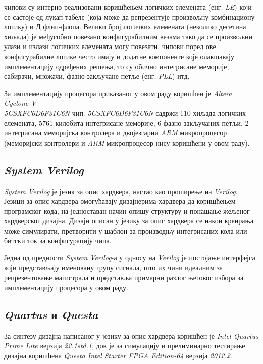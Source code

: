  чипови су интерно реализовани коришћењем логичких елемената (енг. \textit{\acrfull{LE}}) који се састоје од лукап табеле (која може да репрезентује произвољну комбинациону логику) и Д флип-флопа.
Велики број логичких елемената (неколико десетина хиљада) је међусобно повезано конфигурабилним везама тако да се произвољни улази и излази логичких елемената могу повезати.
 чипови поред ове конфигурабилне логике често имају и додатне компоненте које олакшавају имплементацију одређених решења, то су обично интегрисане меморије, сабирачи, множачи, фазно закључане петље (енг. \textit{\acrfull{PLL}}) итд.

За имплементацију процесора приказаног у овом раду коришћен је \textit{Altera Cyclone V \\ 5CSXFC6D6F31C6N} \cite{cycv_hb}  чип.
\textit{5CSXFC6D6F31C6N} садржи 110 хиљада логичких елемената, 5761 килобита интегрисане меморије, 6 фазно закључаних петљи, 2 интегрисана меморијска контролера и двојезгарни \textit{ARM} микропроцесор (меморијски контролери и \textit{ARM} микропроцесор нису коришћени у овом раду). 

\subsection{\textit{System Verilog}}

\textit{System Verilog} \cite{sv_spec} је језик за опис хардвера, настао као проширење на \textit{Verilog}.
Језици за опис хардвера омогућавају дизајнерима хардвера да коришћењем програмског кода, на једноставан начин опишу структуру и понашање жељеног хардверског дизајна.
Дизајн описан у језику за опис хардвера се након креирања може симулирати, претворити у шаблон за производњу интегрисаних кола или битски ток за конфигурацију  чипа.

Једна од предности \textit{System Verilog}-а у односу на \textit{Verilog} је постојање интерфејса који представљају именовану групу сигнала, што их чини идеалним за репрезентовање магистрала и представља примарни разлог његовог избора за имплементацију процесора у овом раду.

\subsection{\textit{Quartus} и \textit{Questa}}

За синтезу дизајна написаног у језику за опис хардвера коришћен је \textit{Intel Quartus Prime Lite} \cite{quartus_man} верзија \textit{22.1std.1}, док је за симулацију и прелиминарно тестирање дизајна коришћена \textit{Questa Intel Starter FPGA Edition-64} \cite{questa_man} верзија \textit{2012.2}.


